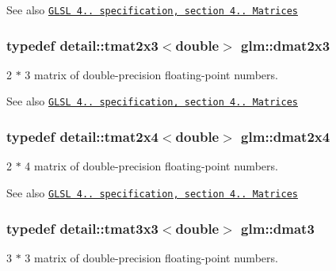\begin{DoxySeeAlso}{\-See also}
\href{http://www.opengl.org/registry/doc/GLSLangSpec.4.20.8.pdf}{\tt \-G\-L\-S\-L 4.. specification, section 4.. \-Matrices} 
\end{DoxySeeAlso}
\hypertarget{group__core__types_gadba2f0efb492f511466de9784b0e07cd}{
\subsubsection[{dmat2x3}]{\setlength{\rightskip}{0pt plus 5cm}typedef detail\-::tmat2x3$<$double$>$ {\bf glm\-::dmat2x3}}}\label{group__core__types_gadba2f0efb492f511466de9784b0e07cd}
2 $\ast$ 3 matrix of double-\/precision floating-\/point numbers.

\begin{DoxySeeAlso}{\-See also}
\href{http://www.opengl.org/registry/doc/GLSLangSpec.4.20.8.pdf}{\tt \-G\-L\-S\-L 4.. specification, section 4.. \-Matrices} 
\end{DoxySeeAlso}
\hypertarget{group__core__types_gaa97c63383e2dc472510d77409a7d5001}{
\subsubsection[{dmat2x4}]{\setlength{\rightskip}{0pt plus 5cm}typedef detail\-::tmat2x4$<$double$>$ {\bf glm\-::dmat2x4}}}\label{group__core__types_gaa97c63383e2dc472510d77409a7d5001}
2 $\ast$ 4 matrix of double-\/precision floating-\/point numbers.

\begin{DoxySeeAlso}{\-See also}
\href{http://www.opengl.org/registry/doc/GLSLangSpec.4.20.8.pdf}{\tt \-G\-L\-S\-L 4.. specification, section 4.. \-Matrices} 
\end{DoxySeeAlso}
\hypertarget{group__core__types_ga557f8357220829c6a6a3e28640e33507}{
\subsubsection[{dmat3}]{\setlength{\rightskip}{0pt plus 5cm}typedef detail\-::tmat3x3$<$double$>$ {\bf glm\-::dmat3}}}\label{group__core__types_ga557f8357220829c6a6a3e28640e33507}
3 $\ast$ 3 matrix of double-\/precision floating-\/point numbers.


